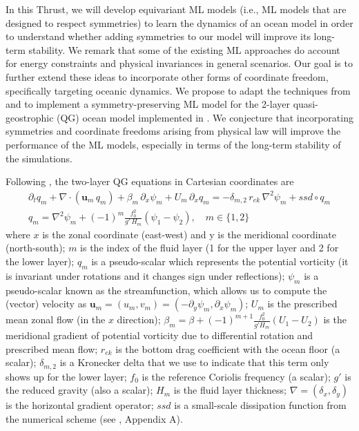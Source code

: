 \documentclass[11pt]{article}
\begin{document}
In this Thrust, we will develop equivariant ML models (i.e., ML models that are designed to respect symmetries) to learn the dynamics of an ocean model in order to understand whether adding symmetries to our model will improve its long-term stability.
We remark that some of the existing ML approaches do account for energy constraints \cite{guan2023learning} and physical invariances \cite{frezat2021physical, guan2023learning, pawar2023frame, Bolton2019} in general scenarios. Our goal is to further extend these ideas to incorporate other forms of coordinate freedom, specifically targeting oceanic dynamics. We propose to adapt the techniques from \cite{villar2021scalars} and \cite{xu2022pde} to implement a symmetry-preserving ML model for the 2-layer quasi-geostrophic (QG) ocean model implemented in \cite{pyqg}. We conjecture that incorporating symmetries and coordinate freedoms arising from physical law will improve the performance of the ML models, especially in terms of the long-term stability of the simulations.

Following \cite{pyqg}, the two-layer QG equations in Cartesian coordinates are
\begin{align} \label{eq.QG1}
    \partial_t q_m + \nabla\cdot (\mathbf u_m \,q_m) + \beta_m\, \partial_x \psi_m + U_m\,\partial_x q_m = -\delta_{m,2}\,r_{ek}\,\nabla^2\psi_m +ssd\circ q_m \\
    q_m = \nabla^2\psi_m+(-1)^m\frac{f_0^2}{g'\,H_m}(\psi_1-\psi_2), \quad m\in\{1,2\}
    \label{eq.QG2}
\end{align}
where $x$ is the zonal coordinate (east-west) and y is the meridional coordinate (north-south); $m$ is the index of the fluid layer (1 for the upper layer and 2 for the lower layer); $q_m$ is a pseudo-scalar which represents the potential vorticity (it is invariant under rotations and it changes sign under reflections); $\psi_m$ is a pseudo-scalar known as the streamfunction, which allows us to compute the (vector) velocity as 
$\mathbf u_m=(u_m, v_m) = (-\partial_y\psi_m, \partial_x \psi_m)$; $U_m$ is the prescribed mean zonal flow (in the $x$ direction); $\beta_m = \beta + (-1)^{m+1} \frac{f_0^2}{g'H_m}(U_1-U_2)$ is the meridional gradient of potential vorticity due to differential rotation and prescribed mean flow; $r_{ek}$ is the bottom drag coefficient with the ocean floor (a scalar); $\delta_{m,2}$ is a Kronecker delta that we use to indicate that this term only shows up for the lower layer; $f_0$ is the reference Coriolis frequency (a scalar); $g'$ is the reduced gravity (also a scalar); $H_m$ is the fluid layer thickness; $\nabla = (\delta_x, \delta_y)$ is the horizontal gradient operator; $ssd$ is a small-scale dissipation function from the numerical scheme (see \cite{perezhogin2023generative}, Appendix A). 
\end{document}
